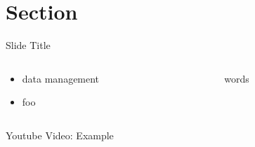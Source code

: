 \section{Section}

\begin{frame}{Slide Title}
\begin{columns}
\begin{column}{0.6\textwidth}
\begin{itemize}
\item data management
\item foo
\end{itemize}
\end{column}
\begin{column}{0.4\textwidth}
\begin{center}
words
\end{center}
\end{column}
\end{columns}
\end{frame}

\begin{frame}{Youtube Video: Example}

\end{frame}
